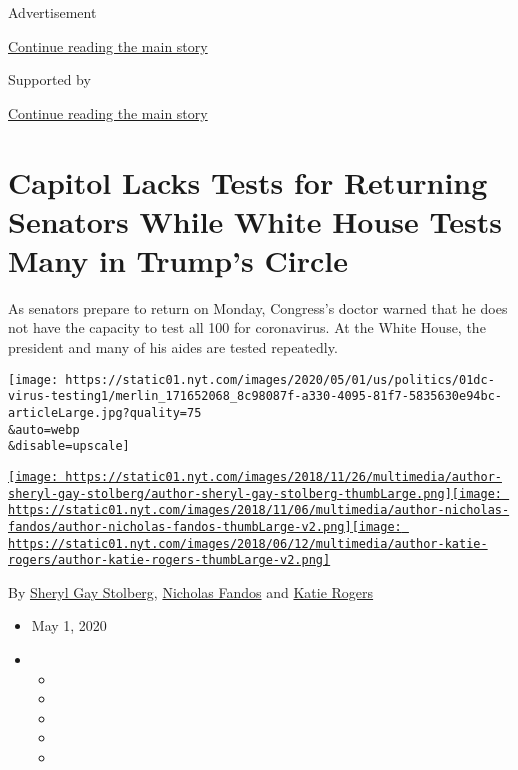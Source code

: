 Advertisement

\protect\hyperlink{after-top}{Continue reading the main story}

Supported by

\protect\hyperlink{after-sponsor}{Continue reading the main story}

\hypertarget{capitol-lacks-tests-for-returning-senators-while-white-house-tests-many-in-trumps-circle}{%
\section{Capitol Lacks Tests for Returning Senators While White House
Tests Many in Trump's
Circle}\label{capitol-lacks-tests-for-returning-senators-while-white-house-tests-many-in-trumps-circle}}

As senators prepare to return on Monday, Congress's doctor warned that
he does not have the capacity to test all 100 for coronavirus. At the
White House, the president and many of his aides are tested repeatedly.

\texttt{[image: https://static01.nyt.com/images/2020/05/01/us/politics/01dc-virus-testing1/merlin\_171652068\_8c98087f-a330-4095-81f7-5835630e94bc-articleLarge.jpg?quality=75\\\&auto=webp\\\&disable=upscale]}

\href{https://www.nytimes.com/by/sheryl-gay-stolberg}{\texttt{[image: https://static01.nyt.com/images/2018/11/26/multimedia/author-sheryl-gay-stolberg/author-sheryl-gay-stolberg-thumbLarge.png]}}\href{https://www.nytimes.com/by/nicholas-fandos}{\texttt{[image: https://static01.nyt.com/images/2018/11/06/multimedia/author-nicholas-fandos/author-nicholas-fandos-thumbLarge-v2.png]}}\href{https://www.nytimes.com/by/katie-rogers}{\texttt{[image: https://static01.nyt.com/images/2018/06/12/multimedia/author-katie-rogers/author-katie-rogers-thumbLarge-v2.png]}}

By \href{https://www.nytimes.com/by/sheryl-gay-stolberg}{Sheryl Gay
Stolberg}, \href{https://www.nytimes.com/by/nicholas-fandos}{Nicholas
Fandos} and \href{https://www.nytimes.com/by/katie-rogers}{Katie Rogers}

\begin{itemize}
\item
  May 1, 2020
\item
  \begin{itemize}
  \item
  \item
  \item
  \item
  \item
  \end{itemize}
\end{itemize}

